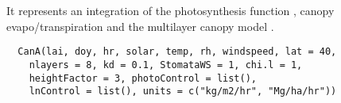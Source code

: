 \documentclass[letterpaper]{book}
\begin{document}
%
\begin{Description}\relax
It represents an integration of the photosynthesis
function , canopy
evapo/transpiration and the multilayer canopy model
.
\end{Description}
%
\begin{Usage}
\begin{verbatim}
  CanA(lai, doy, hr, solar, temp, rh, windspeed, lat = 40,
    nlayers = 8, kd = 0.1, StomataWS = 1, chi.l = 1,
    heightFactor = 3, photoControl = list(),
    lnControl = list(), units = c("kg/m2/hr", "Mg/ha/hr"))
\end{verbatim}
\end{Usage}
%
\end{document}
